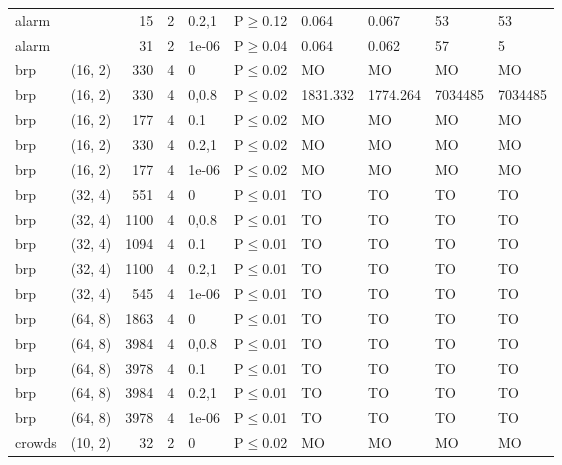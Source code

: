 \begin{longtable}{llrrllllll}
 alarm         &          &     	15 &   2 & 0.2,1 & P$\geq$0.12  & 0.064    & 0.067    & 53      & 53      \\
 alarm         &          &     	31 &   2 & 1e-06 & P$\geq$0.04  & 0.064    & 0.062    & 57      & 5       \\
 brp           & (16, 2)  &    	330 &   4 & 0     & P$\leq$0.02  & MO       & MO       & MO      & MO      \\
 brp           & (16, 2)  &    	330 &   4 & 0,0.8 & P$\leq$0.02  & 1831.332 & 1774.264 & 7034485 & 7034485 \\
 brp           & (16, 2)  &    	177 &   4 & 0.1   & P$\leq$0.02  & MO       & MO       & MO      & MO      \\
 brp           & (16, 2)  &    	330 &   4 & 0.2,1 & P$\leq$0.02  & MO       & MO       & MO      & MO      \\
 brp           & (16, 2)  &    	177 &   4 & 1e-06 & P$\leq$0.02  & MO       & MO       & MO      & MO      \\
 brp           & (32, 4)  &    	551 &   4 & 0     & P$\leq$0.01  & TO       & TO       & TO      & TO      \\
 brp           & (32, 4)  &   	1100 &   4 & 0,0.8 & P$\leq$0.01  & TO       & TO       & TO      & TO      \\
 brp           & (32, 4)  &   	1094 &   4 & 0.1   & P$\leq$0.01  & TO       & TO       & TO      & TO      \\
 brp           & (32, 4)  &   	1100 &   4 & 0.2,1 & P$\leq$0.01  & TO       & TO       & TO      & TO      \\
 brp           & (32, 4)  &    	545 &   4 & 1e-06 & P$\leq$0.01  & TO       & TO       & TO      & TO      \\
 brp           & (64, 8)  &   	1863 &   4 & 0     & P$\leq$0.01  & TO       & TO       & TO      & TO      \\
 brp           & (64, 8)  &   	3984 &   4 & 0,0.8 & P$\leq$0.01  & TO       & TO       & TO      & TO      \\
 brp           & (64, 8)  &   	3978 &   4 & 0.1   & P$\leq$0.01  & TO       & TO       & TO      & TO      \\
 brp           & (64, 8)  &   	3984 &   4 & 0.2,1 & P$\leq$0.01  & TO       & TO       & TO      & TO      \\
 brp           & (64, 8)  &   	3978 &   4 & 1e-06 & P$\leq$0.01  & TO       & TO       & TO      & TO      \\
 crowds        & (10, 2)  &     	32 &   2 & 0     & P$\leq$0.02  & MO       & MO       & MO      & MO      \\

\end{longtable}
